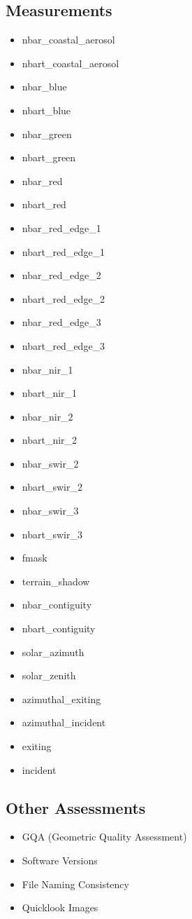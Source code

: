 \documentclass[a4paper]{article}
\begin{document}
    \subsection{Measurements}
      \begin{itemize}
        \item nbar\_coastal\_aerosol
        \item nbart\_coastal\_aerosol
        \item nbar\_blue
        \item nbart\_blue
        \item nbar\_green
        \item nbart\_green
        \item nbar\_red
        \item nbart\_red
        \item nbar\_red\_edge\_1
        \item nbart\_red\_edge\_1
        \item nbar\_red\_edge\_2
        \item nbart\_red\_edge\_2
        \item nbar\_red\_edge\_3
        \item nbart\_red\_edge\_3
        \item nbar\_nir\_1
        \item nbart\_nir\_1
        \item nbar\_nir\_2
        \item nbart\_nir\_2
        \item nbar\_swir\_2
        \item nbart\_swir\_2
        \item nbar\_swir\_3
        \item nbart\_swir\_3
        \item fmask
        \item terrain\_shadow
        \item nbar\_contiguity
        \item nbart\_contiguity
        \item solar\_azimuth
        \item solar\_zenith
        \item azimuthal\_exiting
        \item azimuthal\_incident
        \item exiting
        \item incident
      \end{itemize}

    \subsection{Other Assessments}
      \begin{itemize}
        \item GQA (Geometric Quality Assessment)
        \item Software Versions
        \item File Naming Consistency
        \item Quicklook Images
      \end{itemize}
\end{document}
